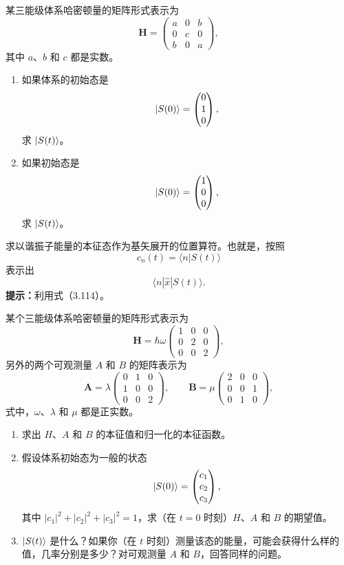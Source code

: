 某三能级体系哈密顿量的矩阵形式表示为
\[
\boldsymbol H=\begin{pmatrix}a&0&b\\0&c&0\\b&0&a\end{pmatrix},
\]
其中 $a$、$b$ 和 $c$ 都是实数。
\begin{enumerate}
\item 如果体系的初始态是
\[
\lvert S(0)\rangle=\begin{pmatrix}0\\1\\0\end{pmatrix},
\]
求 $\lvert S(t)\rangle$。
\item 如果初始态是
\[
\lvert S(0)\rangle=\begin{pmatrix}1\\0\\0\end{pmatrix},
\]
求 $\lvert S(t)\rangle$。
\end{enumerate}
\vfill

求以谐振子能量的本征态作为基矢展开的位置算符。也就是，按照
\[
c_n(t)=\langle n|S(t)\rangle
\]
表示出
\[
\langle n|\hat x|S(t)\rangle.
\]
\textbf{提示：}利用式（3.114）。
\vfill

某个三能级体系哈密顿量的矩阵形式表示为
\[
\boldsymbol H=\hbar\omega\begin{pmatrix}1&0&0\\0&2&0\\0&0&2\end{pmatrix},
\]
另外的两个可观测量 $A$ 和 $B$ 的矩阵表示为
\[
\boldsymbol A=\lambda\begin{pmatrix}0&1&0\\1&0&0\\0&0&2\end{pmatrix},\qquad
\boldsymbol B=\mu\begin{pmatrix}2&0&0\\0&0&1\\0&1&0\end{pmatrix},
\]
式中，$\omega$、$\lambda$ 和 $\mu$ 都是正实数。
\begin{enumerate}
\item 求出 $H$、$A$ 和 $B$ 的本征值和归一化的本征函数。
\item 假设体系初始态为一般的状态
\[
\lvert S(0)\rangle=\begin{pmatrix}c_1\\c_2\\c_3\end{pmatrix},
\]
其中 $|c_1|^2+|c_2|^2+|c_3|^2=1$，求（在 $t=0$ 时刻）$H$、$A$ 和 $B$ 的期望值。
\item $\lvert S(t)\rangle$ 是什么？如果你（在 $t$ 时刻）测量该态的能量，可能会获得什么样的值，几率分别是多少？对可观测量 $A$ 和 $B$，回答同样的问题。
\end{enumerate}
\vfill

